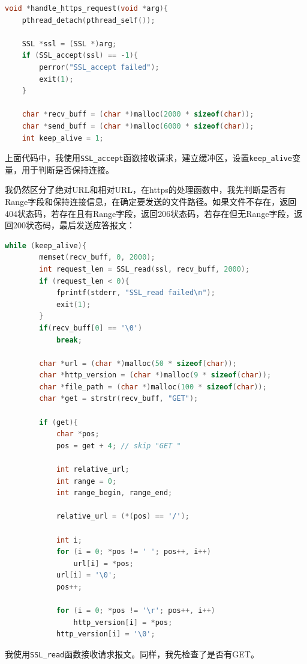 \documentclass[UTF8]{article}
\begin{document}
\begin{lstlisting}[language=c]
void *handle_https_request(void *arg){   
    pthread_detach(pthread_self());

    SSL *ssl = (SSL *)arg;
    if (SSL_accept(ssl) == -1){
        perror("SSL_accept failed");
        exit(1);
    }

    char *recv_buff = (char *)malloc(2000 * sizeof(char));
    char *send_buff = (char *)malloc(6000 * sizeof(char));
    int keep_alive = 1;
\end{lstlisting}

上面代码中，我使用\texttt{SSL\_accept}函数接收请求，建立缓冲区，设置\texttt{keep\_alive}变量，用于判断是否保持连接。

我仍然区分了绝对URL和相对URL，在https的处理函数中，我先判断是否有Range字段和保持连接信息，在确定要发送的文件路径。如果文件不存在，返回404状态码，若存在且有Range字段，返回206状态码，若存在但无Range字段，返回200状态码，最后发送应答报文：

\begin{lstlisting}[language=c]
    while (keep_alive){
        memset(recv_buff, 0, 2000);
        int request_len = SSL_read(ssl, recv_buff, 2000);
        if (request_len < 0){
            fprintf(stderr, "SSL_read failed\n");
            exit(1);
        }
        if(recv_buff[0] == '\0')
            break;

        char *url = (char *)malloc(50 * sizeof(char));
        char *http_version = (char *)malloc(9 * sizeof(char));
        char *file_path = (char *)malloc(100 * sizeof(char));
        char *get = strstr(recv_buff, "GET");

        if (get){
            char *pos;
            pos = get + 4; // skip "GET "

            int relative_url;
            int range = 0;
            int range_begin, range_end;

            relative_url = (*(pos) == '/');

            int i;
            for (i = 0; *pos != ' '; pos++, i++)
                url[i] = *pos;
            url[i] = '\0';
            pos++;

            for (i = 0; *pos != '\r'; pos++, i++)
                http_version[i] = *pos;
            http_version[i] = '\0';
\end{lstlisting}

我使用\texttt{SSL\_read}函数接收请求报文。同样，我先检查了是否有GET。
\end{document}
